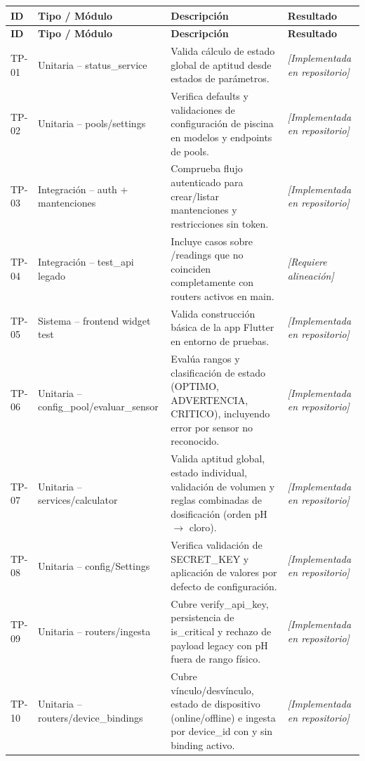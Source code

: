 \documentclass[11pt, a4paper]{article}
\begin{document}
\begin{longtable}{@{} p{1.3cm} p{4.6cm} p{7.2cm} p{2cm} @{}}
  \toprule
  \textbf{ID} & \textbf{Tipo / Módulo} & \textbf{Descripción} & \textbf{Resultado} \\
  \midrule
  \endfirsthead
  \toprule
  \textbf{ID} & \textbf{Tipo / Módulo} & \textbf{Descripción} & \textbf{Resultado} \\
  \midrule
  \endhead
  TP-01 & Unitaria -- status\_service & Valida cálculo de estado global de aptitud desde estados de parámetros. & \textit{[Implementada en repositorio]} \\
  TP-02 & Unitaria -- pools/settings & Verifica defaults y validaciones de configuración de piscina en modelos y endpoints de pools. & \textit{[Implementada en repositorio]} \\
  TP-03 & Integración -- auth + mantenciones & Comprueba flujo autenticado para crear/listar mantenciones y restricciones sin token. & \textit{[Implementada en repositorio]} \\
  TP-04 & Integración -- test\_api legado & Incluye casos sobre /readings que no coinciden completamente con routers activos en main. & \textit{[Requiere alineación]} \\
  TP-05 & Sistema -- frontend widget test & Valida construcción básica de la app Flutter en entorno de pruebas. & \textit{[Implementada en repositorio]} \\
  TP-06 & Unitaria -- config\_pool/evaluar\_sensor & Evalúa rangos y clasificación de estado (OPTIMO, ADVERTENCIA, CRITICO), incluyendo error por sensor no reconocido. & \textit{[Implementada en repositorio]} \\
  TP-07 & Unitaria -- services/calculator & Valida aptitud global, estado individual, validación de volumen y reglas combinadas de dosificación (orden pH $\rightarrow$ cloro). & \textit{[Implementada en repositorio]} \\
  TP-08 & Unitaria -- config/Settings & Verifica validación de SECRET\_KEY y aplicación de valores por defecto de configuración. & \textit{[Implementada en repositorio]} \\
  TP-09 & Unitaria -- routers/ingesta & Cubre verify\_api\_key, persistencia de is\_critical y rechazo de payload legacy con pH fuera de rango físico. & \textit{[Implementada en repositorio]} \\
  TP-10 & Unitaria -- routers/device\_bindings & Cubre vínculo/desvínculo, estado de dispositivo (online/offline) e ingesta por device\_id con y sin binding activo. & \textit{[Implementada en repositorio]} \\
  \bottomrule
\end{longtable}
\end{document}
